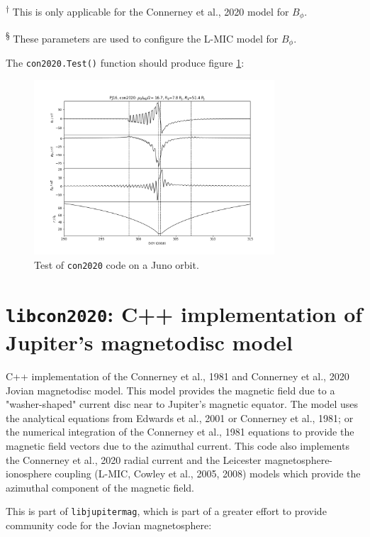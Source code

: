 	\textsuperscript{†} This is only applicable for the Connerney et al., 2020 model for $B_{\phi}$.
	
	\textsuperscript{§} These parameters are used to configure the L-MIC model for $B_{\phi}$.
	
	The \texttt{con2020.Test()} function should produce figure \ref{Figcon20202Test}:
	
	\begin{figure}
		\centering\includegraphics[width=0.8\textwidth]{figures/ch3_con2020Test.png}
		\caption{Test of \texttt{con2020} code on a Juno orbit.\label{Figcon20202Test}}
	\end{figure}


	\section{\texttt{libcon2020}: C++ implementation of Jupiter's magnetodisc model}


	
	C++ implementation of the Connerney et al., 1981 and Connerney et al., 2020 Jovian magnetodisc model. This model provides the magnetic field due to a "washer-shaped" current disc near to Jupiter's magnetic equator. The model uses the analytical equations from Edwards et al., 2001 or Connerney et al., 1981; or the numerical integration of the Connerney et al., 1981 equations to provide the magnetic field vectors due to the azimuthal current. This code also implements the Connerney et al., 2020 radial current and the Leicester magnetosphere-ionosphere coupling (L-MIC, Cowley et al., 2005, 2008) models which provide the azimuthal component of the magnetic field.
	
	This is part of \texttt{libjupitermag}, which is part of a greater effort to provide community code for the Jovian magnetosphere:
	
